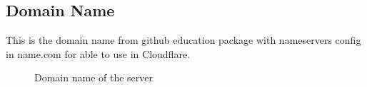 \documentclass[12pt,oneside,openright,a4paper]{cpe-english-project}
\begin{document}
	\subsection{Domain Name}
		This is the domain name from github education package with nameservers config in name.com for able to use in Cloudflare.
		\begin{figure}[!h]\centering
			\caption{Domain name of the server}\label{fig:Domain name of the server}
		\end{figure}
		\pagebreak	
\end{document}
